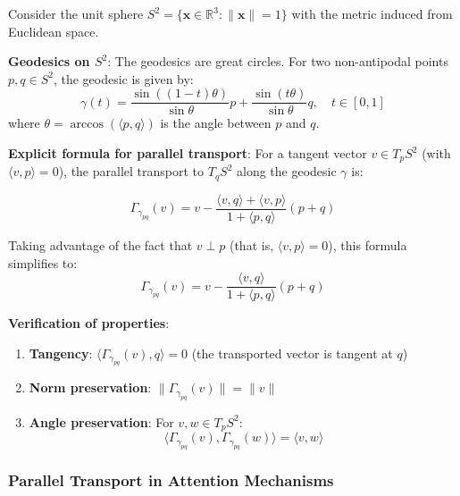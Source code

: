 \begin{example}\label{ex:parallel_transport_sphere}
Consider the unit sphere $S^2 = \{\mathbf{x} \in \mathbb{R}^3 : \|\mathbf{x}\| = 1\}$ with the metric induced from Euclidean space.

\textbf{Geodesics on $S^2$}: The geodesics are great circles. For two non-antipodal points $p, q \in S^2$, the geodesic is given by:
\begin{equation}
\gamma(t) = \frac{\sin((1-t)\theta)}{\sin\theta} p + \frac{\sin(t\theta)}{\sin\theta} q, \quad t \in [0,1]
\end{equation}
where $\theta = \arccos(\langle p, q \rangle)$ is the angle between $p$ and $q$.

\textbf{Explicit formula for parallel transport}: For a tangent vector $v \in T_p S^2$ (with $\langle v, p \rangle = 0$), the parallel transport to $T_q S^2$ along the geodesic $\gamma$ is:

\begin{equation}
\Gamma_{\gamma_{pq}}(v) = v - \frac{\langle v, q \rangle + \langle v, p \rangle}{1 + \langle p, q \rangle}(p + q)
\label{eq:parallel_transport_sphere_formula}
\end{equation}

Taking advantage of the fact that $v \perp p$ (that is, $\langle v, p \rangle = 0$), this formula simplifies to:
\begin{equation}
\Gamma_{\gamma_{pq}}(v) = v - \frac{\langle v, q \rangle}{1 + \langle p, q \rangle}(p + q)
\end{equation}

\textbf{Verification of properties}:
\begin{enumerate}
    \item \textbf{Tangency}: $\langle \Gamma_{\gamma_{pq}}(v), q \rangle = 0$ (the transported vector is tangent at $q$)
    \item \textbf{Norm preservation}: $\|\Gamma_{\gamma_{pq}}(v)\| = \|v\|$
    \item \textbf{Angle preservation}: For $v, w \in T_p S^2$:
    \begin{equation}
    \langle \Gamma_{\gamma_{pq}}(v), \Gamma_{\gamma_{pq}}(w) \rangle = \langle v, w \rangle
    \end{equation}
\end{enumerate}
\end{example}

\subsubsection{Parallel Transport in Attention Mechanisms}

